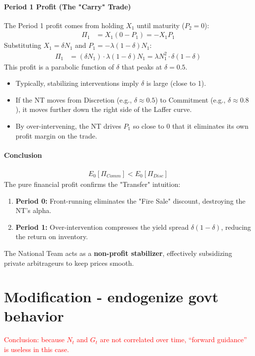 \documentclass[12pt]{article}
\begin{document}
\paragraph{Period 1 Profit (The "Carry" Trade)}
The Period 1 profit comes from holding $X_1$ until maturity ($P_2=0$):
\begin{align}
    \Pi_1 &= X_1 (0 - P_1) = - X_1 P_1
\end{align}
Substituting $X_1 = \delta N_1$ and $P_1 = -\lambda (1-\delta) N_1$:
\begin{align}
    \Pi_1 &= (\delta N_1) \cdot \lambda (1-\delta) N_1 = \lambda N_1^2 \cdot \delta(1-\delta)
\end{align}
This profit is a parabolic function of $\delta$ that peaks at $\delta = 0.5$.
\begin{itemize}
    \item Typically, stabilizing interventions imply $\delta$ is large (close to 1).
    \item If the NT moves from Discretion (e.g., $\delta \approx 0.5$) to Commitment (e.g., $\delta \approx 0.8$), it moves further down the right side of the Laffer curve.
    \item By over-intervening, the NT drives $P_1$ so close to 0 that it eliminates its own profit margin on the trade.
\end{itemize}

\paragraph{Conclusion}
\begin{align}
    E_0[\Pi_{Comm}] < E_0[\Pi_{Disc}]
\end{align}
The pure financial profit confirms the "Transfer" intuition:
\begin{enumerate}
    \item \textbf{Period 0:} Front-running eliminates the "Fire Sale" discount, destroying the NT's alpha.
    \item \textbf{Period 1:} Over-intervention compresses the yield spread $\delta(1-\delta)$, reducing the return on inventory.
\end{enumerate}
The National Team acts as a \textbf{non-profit stabilizer}, effectively subsidizing private arbitrageurs to keep prices smooth.
\color{black}

\newpage
\section{Modification - endogenize govt behavior}
\textcolor{red}{Conclusion: because $N_t$ and $G_t$ are not correlated over time, ``forward guidance'' is useless in this case.}
\end{document}
